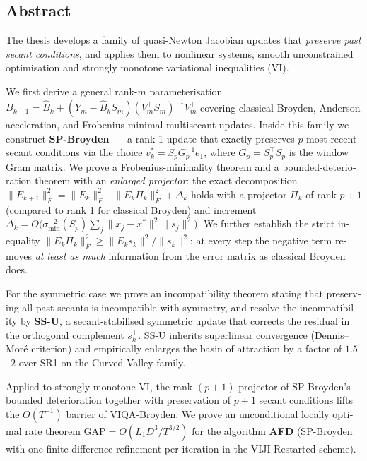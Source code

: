 
\begin{otherlanguage}{english}

\chapter*{Abstract}

\noindent
The thesis develops a family of quasi-Newton Jacobian updates that
\emph{preserve past secant conditions}, and applies them to nonlinear
systems, smooth unconstrained optimisation and strongly monotone
variational inequalities (VI).

We first derive a general rank-$m$ parameterisation
$B_{k+1} = \widehat{B}_k + (Y_m - \widehat{B}_k S_m)
  (V_m^{\top} S_m)^{-1} V_m^{\top}$
covering classical Broyden, Anderson acceleration, and Frobenius-minimal
multisecant updates. Inside this family we construct
\textbf{SP-Broyden}~--- a rank-1 update that exactly preserves $p$ most
recent secant conditions via the choice
$v_k^{*} = S_p G_p^{-1} e_1$, where $G_p = S_p^{\top} S_p$
is the window Gram matrix. We prove a Frobenius-minimality theorem
and a bounded-deterioration theorem with an \emph{enlarged projector}:
the exact decomposition
$\|E_{k+1}\|_F^2 = \|E_k\|_F^2 - \|E_k\Pi_k\|_F^2 + \Delta_k$
holds with a projector $\Pi_k$ of rank $p{+}1$ (compared to rank 1 for
classical Broyden) and increment
$\Delta_k = O\!\bigl(\sigma_{\min}^{-2}(S_p)\sum_j \|x_j-x^{*}\|^2 \|s_j\|^2\bigr)$.
We further establish the strict inequality
$\|E_k\Pi_k\|_F^2 \ge \|E_k s_k\|^2/\|s_k\|^2$: at every step
the negative term removes \emph{at least as much} information from the
error matrix as classical Broyden does.

For the symmetric case we prove an incompatibility theorem stating that
preserving all past secants is incompatible with symmetry, and resolve
the incompatibility by \textbf{SS-U}, a secant-stabilised symmetric update
that corrects the residual in the orthogonal complement $s_k^{\perp}$.
SS-U inherits superlinear convergence (Dennis--Mor\'e criterion)
and empirically enlarges the basin of attraction by a factor of
$1.5$--$2$ over SR1 on the Curved Valley family.

Applied to strongly monotone VI, the rank-$(p{+}1)$ projector of
SP-Broyden's bounded deterioration together with preservation of
$p{+}1$ secant conditions lifts the $O(T^{-1})$ barrier of VIQA-Broyden.
We prove an unconditional locally optimal rate theorem
$\mathrm{GAP} = O(L_1 D^3 / T^{3/2})$ for the algorithm \textbf{AFD}
(SP-Broyden with one finite-difference refinement per iteration in the
VIJI-Restarted scheme).


\end{otherlanguage}
